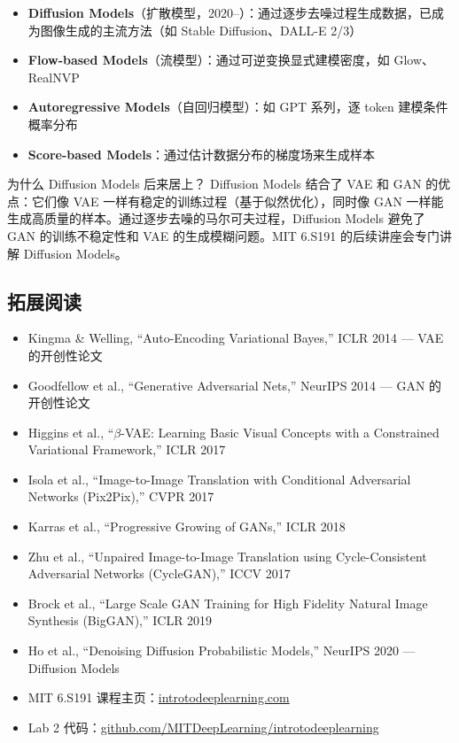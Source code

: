 \documentclass[a4paper]{article}
\begin{document}
\begin{itemize}
    \item \textbf{Diffusion Models}（扩散模型，2020--）：通过逐步去噪过程生成数据，已成为图像生成的主流方法（如 Stable Diffusion、DALL-E 2/3）
    \item \textbf{Flow-based Models}（流模型）：通过可逆变换显式建模密度，如 Glow、RealNVP
    \item \textbf{Autoregressive Models}（自回归模型）：如 GPT 系列，逐 token 建模条件概率分布
    \item \textbf{Score-based Models}：通过估计数据分布的梯度场来生成样本
\end{itemize}

\begin{knowledgebox}{为什么 Diffusion Models 后来居上？}
Diffusion Models 结合了 VAE 和 GAN 的优点：它们像 VAE 一样有稳定的训练过程（基于似然优化），同时像 GAN 一样能生成高质量的样本。通过逐步去噪的马尔可夫过程，Diffusion Models 避免了 GAN 的训练不稳定性和 VAE 的生成模糊问题。MIT 6.S191 的后续讲座会专门讲解 Diffusion Models。
\end{knowledgebox}

\subsection{拓展阅读}

\begin{itemize}
    \item Kingma \& Welling, ``Auto-Encoding Variational Bayes,'' ICLR 2014 --- VAE 的开创性论文
    \item Goodfellow et al., ``Generative Adversarial Nets,'' NeurIPS 2014 --- GAN 的开创性论文
    \item Higgins et al., ``$\beta$-VAE: Learning Basic Visual Concepts with a Constrained Variational Framework,'' ICLR 2017
    \item Isola et al., ``Image-to-Image Translation with Conditional Adversarial Networks (Pix2Pix),'' CVPR 2017
    \item Karras et al., ``Progressive Growing of GANs,'' ICLR 2018
    \item Zhu et al., ``Unpaired Image-to-Image Translation using Cycle-Consistent Adversarial Networks (CycleGAN),'' ICCV 2017
    \item Brock et al., ``Large Scale GAN Training for High Fidelity Natural Image Synthesis (BigGAN),'' ICLR 2019
    \item Ho et al., ``Denoising Diffusion Probabilistic Models,'' NeurIPS 2020 --- Diffusion Models
    \item MIT 6.S191 课程主页：\href{https://introtodeeplearning.com}{introtodeeplearning.com}
    \item Lab 2 代码：\href{https://github.com/MITDeepLearning/introtodeeplearning}{github.com/MITDeepLearning/introtodeeplearning}
\end{itemize}

\end{document}
